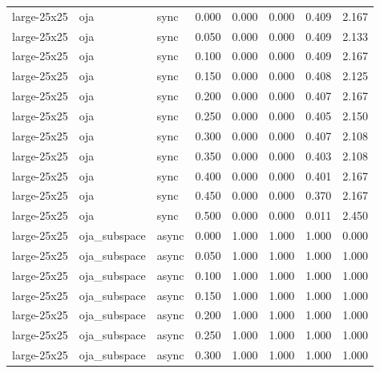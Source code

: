 \begin{tabular}{lllrrrrr}
large-25x25 & oja & sync & 0.000 & 0.000 & 0.000 & 0.409 & 2.167 \\

large-25x25 & oja & sync & 0.050 & 0.000 & 0.000 & 0.409 & 2.133 \\

large-25x25 & oja & sync & 0.100 & 0.000 & 0.000 & 0.409 & 2.167 \\

large-25x25 & oja & sync & 0.150 & 0.000 & 0.000 & 0.408 & 2.125 \\

large-25x25 & oja & sync & 0.200 & 0.000 & 0.000 & 0.407 & 2.167 \\

large-25x25 & oja & sync & 0.250 & 0.000 & 0.000 & 0.405 & 2.150 \\

large-25x25 & oja & sync & 0.300 & 0.000 & 0.000 & 0.407 & 2.108 \\

large-25x25 & oja & sync & 0.350 & 0.000 & 0.000 & 0.403 & 2.108 \\

large-25x25 & oja & sync & 0.400 & 0.000 & 0.000 & 0.401 & 2.167 \\

large-25x25 & oja & sync & 0.450 & 0.000 & 0.000 & 0.370 & 2.167 \\

large-25x25 & oja & sync & 0.500 & 0.000 & 0.000 & 0.011 & 2.450 \\

large-25x25 & oja\_subspace & async & 0.000 & 1.000 & 1.000 & 1.000 & 0.000 \\

large-25x25 & oja\_subspace & async & 0.050 & 1.000 & 1.000 & 1.000 & 1.000 \\

large-25x25 & oja\_subspace & async & 0.100 & 1.000 & 1.000 & 1.000 & 1.000 \\

large-25x25 & oja\_subspace & async & 0.150 & 1.000 & 1.000 & 1.000 & 1.000 \\

large-25x25 & oja\_subspace & async & 0.200 & 1.000 & 1.000 & 1.000 & 1.000 \\

large-25x25 & oja\_subspace & async & 0.250 & 1.000 & 1.000 & 1.000 & 1.000 \\

large-25x25 & oja\_subspace & async & 0.300 & 1.000 & 1.000 & 1.000 & 1.000 \\


\end{tabular}
